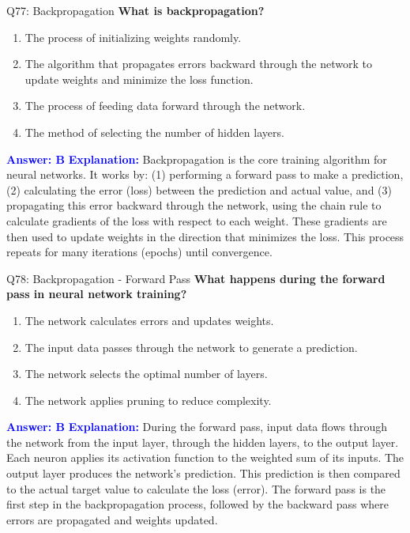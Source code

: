 \documentclass[8pt]{beamer}
\begin{document}
	\begin{frame}{Q77: Backpropagation}
		\fontsize{6.5}{7.5}\selectfont
		\textbf{What is backpropagation?}
		\begin{enumerate}
			\item The process of initializing weights randomly.
			\item The algorithm that propagates errors backward through the network to update weights and minimize the loss function.
			\item The process of feeding data forward through the network.
			\item The method of selecting the number of hidden layers.
		\end{enumerate}
		\vspace{0.1cm}
		\textcolor{blue}{\textbf{Answer: B}}
		\vspace{0.1cm}
		\textcolor{blue}{\textbf{Explanation:}} Backpropagation is the core training algorithm for neural networks. It works by: (1) performing a forward pass to make a prediction, (2) calculating the error (loss) between the prediction and actual value, and (3) propagating this error backward through the network, using the chain rule to calculate gradients of the loss with respect to each weight. These gradients are then used to update weights in the direction that minimizes the loss. This process repeats for many iterations (epochs) until convergence.
	\end{frame}
	
	\begin{frame}{Q78: Backpropagation - Forward Pass}
		\fontsize{6.5}{7.5}\selectfont
		\textbf{What happens during the forward pass in neural network training?}
		\begin{enumerate}
			\item The network calculates errors and updates weights.
			\item The input data passes through the network to generate a prediction.
			\item The network selects the optimal number of layers.
			\item The network applies pruning to reduce complexity.
		\end{enumerate}
		\vspace{0.1cm}
		\textcolor{blue}{\textbf{Answer: B}}
		\vspace{0.1cm}
		\textcolor{blue}{\textbf{Explanation:}} During the forward pass, input data flows through the network from the input layer, through the hidden layers, to the output layer. Each neuron applies its activation function to the weighted sum of its inputs. The output layer produces the network's prediction. This prediction is then compared to the actual target value to calculate the loss (error). The forward pass is the first step in the backpropagation process, followed by the backward pass where errors are propagated and weights updated.
	\end{frame}
	
\end{document}
